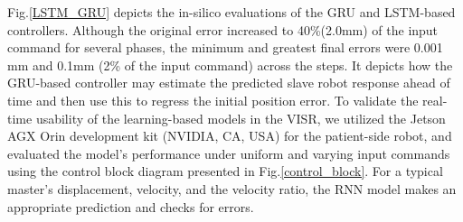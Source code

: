 \documentclass[
    ngerman,american
    ]{scrartcl}
\begin{document}
Fig.\ref{LSTM_GRU} depicts the in-silico evaluations of the GRU and LSTM-based controllers. Although the original error increased to 40\%(2.0mm) of the input command for several phases, the minimum and greatest final errors were 0.001 mm and 0.1mm (2\% of the input command) across the steps. It depicts how the GRU-based controller may estimate the predicted slave robot response ahead of time and then use this to regress the initial position error. To validate the real-time usability of the learning-based models in the VISR, we utilized the Jetson AGX Orin development kit (NVIDIA, CA, USA) for the patient-side robot, and evaluated the model's performance under uniform and varying input commands using the control block diagram presented in Fig.\ref{control_block}. For a typical master's displacement, velocity, and the velocity ratio, the RNN model makes an appropriate prediction and checks for errors.  

	
	
	
%
%
%
%
%  
%    
    
\end{document}
